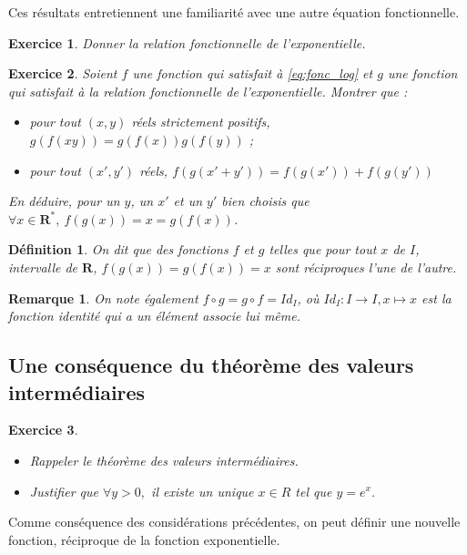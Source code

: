 \documentclass[11pt,a4paper,french]{article}
\newcommand{\R}{\mathbf{R}}
\theoremstyle{break}
\newtheorem{definition}{Définition}
\theoremstyle{plain}
\newtheorem{exerciceT}{Exercice}
\theoremstyle{nonumberplain}
\newtheorem{remarque}{Remarque}
\theoremstyle{nonumberbreak}
\newenvironment{exercice}{\begin{framed}\begin{exerciceT}}{\end{exerciceT}\end{framed}}
\begin{document}
Ces résultats entretiennent une familiarité avec une autre équation
fonctionnelle.

\begin{exercice}
  Donner la relation fonctionnelle de l'exponentielle.
\end{exercice}

\begin{exercice}\label{prop:fondamentale}
  Soient $f$ une fonction qui satisfait à \ref{eq:fonc_log} et $g$ une
  fonction qui satisfait à la relation fonctionnelle de l'exponentielle.
  Montrer que :
  \begin{itemize}
    \item pour tout $(x,y)$ réels strictement positifs, $g(f(xy)) =
      g(f(x))g(f(y))$ ;
    \item pour tout $(x',y')$ réels, $f(g(x'+y')) = f(g(x')) + f(g(y'))$
  \end{itemize}

  En déduire, pour un $y$, un $x'$ et un $y'$ bien choisis que $\forall
  x\in \R^*,\ f(g(x)) = x = g(f(x))$.
\end{exercice}

\begin{definition}
  On dit que des fonctions $f$ et $g$ telles que pour tout $x$ de $I$,
  intervalle de $\R$, $f(g(x)) = g(f(x)) = x$ sont réciproques l'une de
  l'autre.
\end{definition}

\begin{remarque}
  On note également $f\circ g = g\circ f = Id_I$, où $Id_I:I\to I,x
  \mapsto x$ est la fonction identité qui a un élément associe lui même.
\end{remarque}

\subsection{Une conséquence du théorème des valeurs intermédiaires}

\begin{exercice}
  \begin{itemize}
    \item Rappeler le théorème des valeurs intermédiaires.
    \item Justifier que $\forall y > 0,$ il existe un unique $x\in R$
      tel que $y = e^x$.
  \end{itemize}
\end{exercice}

Comme conséquence des considérations précédentes, on peut définir une
nouvelle fonction, réciproque de la fonction exponentielle.
\end{document}
